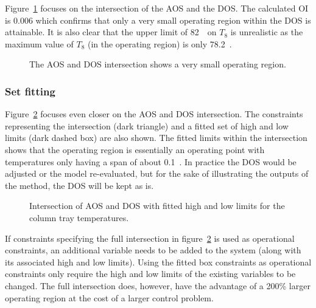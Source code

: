 Figure~\ref{fig:columnaosfocus} focuses on the intersection of the AOS and the DOS.
The calculated OI is 0.006 which confirms that only a very small operating region within the DOS is attainable.
It is also clear that the upper limit of 82~\textcelsius\ on $T_8$ is unrealistic as the maximum value of $T_8$ (in the operating region) is only 78.2~\textcelsius.

\begin{figure}[htbp]
  \centering
    \scalebox{1}{}  
  \caption[AOS and DOS intersection of the laboratory distillation column]{The AOS and DOS intersection shows a very small operating region.}
  \label{fig:columnaosfocus}
\end{figure}

\subsubsection{Set fitting}
Figure~\ref{fig:columnfitbox} focuses even closer on the AOS and DOS intersection.
The constraints representing the intersection (dark triangle) and a fitted set of high and low limits (dark dashed box) are also shown.
The fitted limits within the intersection shows that the operating region is essentially an operating point with temperatures only having a span of about 0.1~\textcelsius.
In practice the DOS would be adjusted or the model re-evaluated, but for the sake of illustrating the outputs of the method, the DOS will be kept as is.
  
\begin{figure}[htbp]
  \centering
    \scalebox{1}{}  
  \caption[Fitted constraints for the laboratory distillation column]{Intersection of AOS and DOS with fitted high and low limits for the column tray temperatures.}
  \label{fig:columnfitbox}
\end{figure}

If constraints specifying the full intersection in figure~\ref{fig:columnfitbox} is used as operational constraints, an additional variable needs to be added to the system (along with its associated high and low limits).
Using the fitted box constraints as operational constraints only require the high and low limits of the existing variables to be changed.
The full intersection does, however, have the advantage of a 200\% larger operating region at the cost of a larger control problem.


